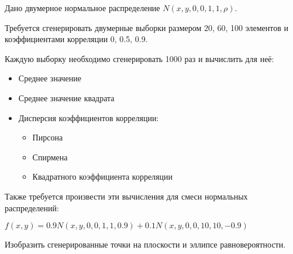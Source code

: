 Дано двумерное нормальное распределение $N(x, y, 0, 0, 1, 1, \rho)$.

Требуется сгенерировать двумерные выборки размером 20, 60, 100 элементов и коэффициентами корреляции 0, 0.5, 0.9.

Каждую выборку необходимо сгенерировать 1000 раз и вычислить для неё:
\begin{itemize}
	\item Среднее значение
	\item Среднее значение квадрата
	\item Дисперсия коэффициентов корреляции:
	\begin{itemize}
		\item Пирсона
		\item Спирмена
		\item Квадратного коэффициента корреляции
	\end{itemize}
\end{itemize}

Также требуется произвести эти вычисления для смеси нормальных распределений:

$f(x, y) = 0.9N(x, y, 0, 0, 1, 1, 0.9) + 0.1N(x, y, 0, 0, 10, 10, -0.9)$

Изобразить сгенерированные точки на плоскости и эллипсе равновероятности.	